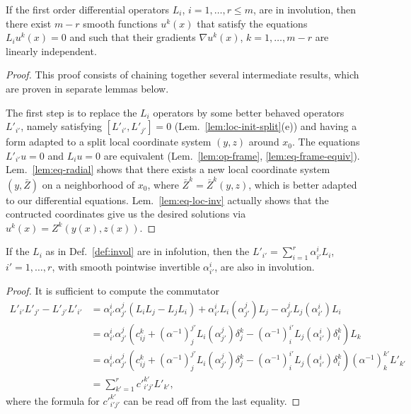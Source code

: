 \begin{theorem} \label{thm:frob-loc}
If the first order differential operators $L_i$, $i=1,\ldots,r \le m$, are in
involution, then there exist $m-r$ smooth functions $u^k(x)$ that satisfy the
equations $L_i u^k(x) = 0$ and such that their gradients $\nabla u^k(x)$,
$k=1,\ldots,m-r$ are linearly independent.
\end{theorem}
\begin{proof}
This proof consists of chaining together several intermediate results, which are
proven in separate lemmas below.

The first step is to replace the $L_i$ operators by some better behaved
operators $L'_{i'}$, namely satisfying $[L'_{i'}, L'_{j'}] = 0$
(Lem.~\ref{lem:loc-init-split}(e)) and having a form adapted to a split local
coordinate system $(y,z)$ around $x_0$. The equations $L'_{i'} u = 0$ and $L_i u
= 0$ are equivalent (Lem.~\ref{lem:op-frame}, \ref{lem:eq-frame-equiv}).
Lem.~\ref{lem:eq-radial} shows that there exists a new local coordinate system
$(y,\bar{Z})$ on a neighborhood of $x_0$, where $\bar{Z}^k=\bar{Z}^k(y,z)$,
which is better adapted to our differential equations. Lem.~\ref{lem:eq-loc-inv}
actually shows that the contructed coordinates give us the desired solutions via
$u^k(x) = Z^k(y(x),z(x))$.
\end{proof}

\begin{lemma} \label{lem:op-frame}
If the $L_i$ as in Def.~\ref{def:invol} are in infolution, then the $L'_{i'} =
\sum_{i=1}^r \alpha_{i'}^i L_i$, $i'=1,\ldots,r$, with smooth pointwise invertible
$\alpha_{i'}^i$, are also in involution.
\end{lemma}
\begin{proof}
It is sufficient to compute the commutator
\begin{align*}
  L'_{i'} L'_{j'} - L'_{j'} L'_{i'}
  &= \alpha_{i'}^i \alpha_{j'}^j (L_i L_j - L_j L_i)
    + \alpha_{i'}^i L_i(\alpha_{j'}^j) L_j
    - \alpha_{j'}^j L_j(\alpha_{i'}^i) L_i
  \\
  &= \alpha_{i'}^i \alpha_{j'}^j \left(c_{ij}^k
    + (\alpha^{-1})_j^{j'} L_i(\alpha_{j'}^j) \delta_j^k
    - (\alpha^{-1})_i^{i'} L_j(\alpha_{i'}^i) \delta_i^k \right) L_k
  \\
  &= \alpha_{i'}^i \alpha_{j'}^j \left(c_{ij}^k
    + (\alpha^{-1})_j^{j'} L_i(\alpha_{j'}^j) \delta_j^k
    - (\alpha^{-1})_i^{i'} L_j(\alpha_{i'}^i) \delta_i^k \right) (\alpha^{-1})_k^{k'} L'_{k'}
  \\
  &= \sum_{k'=1}^r c'^{k'}_{i'j'} L'_{k'} ,
\end{align*}
where the formula for $c'^{k'}_{i'j'}$ can be read off from the last equality.
\end{proof}

